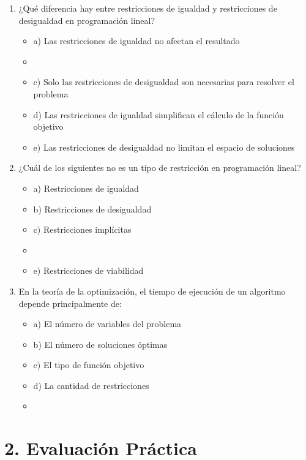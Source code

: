 \documentclass[a4paper,10pt]{article}
\begin{document}
\begin{enumerate}
    \item ¿Qué diferencia hay entre restricciones de igualdad y restricciones de desigualdad en programación lineal?
    \begin{itemize}
        \item a) Las restricciones de igualdad no afectan el resultado
        \item {}
        \item c) Solo las restricciones de desigualdad son necesarias para resolver el problema
        \item d) Las restricciones de igualdad simplifican el cálculo de la función objetivo
        \item e) Las restricciones de desigualdad no limitan el espacio de soluciones
    \end{itemize}

    \item ¿Cuál de los siguientes no es un tipo de restricción en programación lineal?
    \begin{itemize}
        \item a) Restricciones de igualdad
        \item b) Restricciones de desigualdad
        \item c) Restricciones implícitas
        \item {}
        \item e) Restricciones de viabilidad
    \end{itemize}

    \item En la teoría de la optimización, el tiempo de ejecución de un algoritmo depende principalmente de:
    \begin{itemize}
        \item a) El número de variables del problema
        \item b) El número de soluciones óptimas
        \item c) El tipo de función objetivo
        \item d) La cantidad de restricciones
        \item {}
    \end{itemize}
\end{enumerate}

\newpage
\section*{2. Evaluación Práctica}
\end{document}

